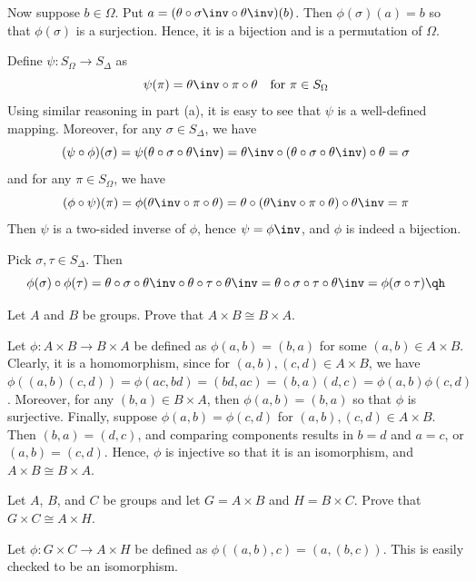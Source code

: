 \begin{problems}
\begin{solalph}
        Now suppose $b \in \Omega$. Put $a = (\theta\circ\sigma\inv\circ\theta\inv)(b)$. Then $\phi(\sigma)(a) = b$ so that $\phi(\sigma)$ is a surjection. Hence, it is a bijection and is a permutation of $\Omega$.
        \item Define $\psi : S_\Omega \to S_\Delta$ as
        \[\psi(\pi) = \theta\inv \circ \pi \circ \theta \quad \text{for $\pi \in S_\Omega$}\]
        Using similar reasoning in part (a), it is easy to see that $\psi$ is a well-defined mapping. Moreover, for any $\sigma \in S_\Delta$, we have
        \[(\psi \circ \phi)(\sigma) = \psi(\theta \circ \sigma \circ \theta\inv) = \theta\inv \circ (\theta \circ \sigma \circ \theta\inv) \circ \theta = \sigma\]
        and for any $\pi \in S_\Omega$, we have
        \[(\phi \circ \psi)(\pi) = \phi(\theta\inv \circ \pi \circ \theta) = \theta \circ (\theta\inv \circ \pi \circ \theta) \circ \theta\inv = \pi\]
        Then $\psi$ is a two-sided inverse of $\phi$, hence $\psi = \phi\inv$, and $\phi$ is indeed a bijection.
        \item Pick $\sigma, \tau \in S_\Delta$. Then
        \[\phi(\sigma) \circ \phi(\tau) = \theta \circ \sigma \circ \theta\inv \circ \theta \circ \tau \circ \theta\inv = \theta \circ \sigma \circ \tau \circ \theta\inv = \phi(\sigma \circ \tau)\qh\]
    \end{solalph}
    \item Let $A$ and $B$ be groups. Prove that $A \times B \cong B \times A$.
    \begin{sol}
        Let $\phi : A \times B \to B \times A$ be defined as $\phi(a, b) = (b, a)$ for some $(a, b) \in A \times B$. Clearly, it is a homomorphism, since for $(a, b), (c, d) \in A \times B$, we have $\phi((a, b)(c, d)) = \phi(ac, bd) = (bd, ac) = (b, a)(d, c) = \phi(a, b)\phi(c, d)$. Moreover, for any $(b, a) \in B \times A$, then $\phi(a, b) = (b, a)$ so that $\phi$ is surjective. Finally, suppose $\phi(a, b) = \phi(c, d)$ for $(a, b), (c, d) \in A \times B$. Then $(b, a) = (d, c)$, and comparing components results in $b = d$ and $a = c$, or $(a, b) = (c, d)$. Hence, $\phi$ is injective so that it is an isomorphism, and $A \times B \cong B \times A$.
    \end{sol}
    \item Let $A$, $B$, and $C$ be groups and let $G = A \times B$ and $H = B \times C$. Prove that $G \times C \cong A \times H$.
    \begin{sol}
        Let $\phi : G \times C \to A \times H$ be defined as $\phi((a, b), c) = (a, (b, c))$. This is easily checked to be an isomorphism.

\end{sol}
\end{problems}
